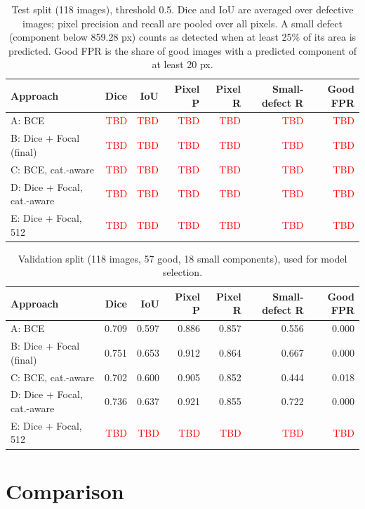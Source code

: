 \documentclass[11pt,a4paper]{article}
\newcommand{\tbd}{\textcolor{red}{TBD}}
\begin{document}
\begin{table}[H]
\centering
\small
\begin{tabular}{lrrrrrr}
\toprule
Approach & Dice & IoU & Pixel P & Pixel R & Small-defect R & Good FPR \\
\midrule
A: BCE & \tbd & \tbd & \tbd & \tbd & \tbd & \tbd \\
B: Dice + Focal (final) & \tbd & \tbd & \tbd & \tbd & \tbd & \tbd \\
C: BCE, cat.-aware & \tbd & \tbd & \tbd & \tbd & \tbd & \tbd \\
D: Dice + Focal, cat.-aware & \tbd & \tbd & \tbd & \tbd & \tbd & \tbd \\
E: Dice + Focal, 512 & \tbd & \tbd & \tbd & \tbd & \tbd & \tbd \\
\bottomrule
\end{tabular}
\caption{Test split (118 images), threshold 0.5. Dice and IoU are averaged over defective images; pixel precision and recall are pooled over all pixels. A small defect (component below 859.28 px) counts as detected when at least 25\% of its area is predicted. Good FPR is the share of good images with a predicted component of at least 20 px.}
\label{tab:test}
\end{table}

\begin{table}[H]
\centering
\small
\begin{tabular}{lrrrrrr}
\toprule
Approach & Dice & IoU & Pixel P & Pixel R & Small-defect R & Good FPR \\
\midrule
A: BCE & 0.709 & 0.597 & 0.886 & 0.857 & 0.556 & 0.000 \\
B: Dice + Focal (final) & 0.751 & 0.653 & 0.912 & 0.864 & 0.667 & 0.000 \\
C: BCE, cat.-aware & 0.702 & 0.600 & 0.905 & 0.852 & 0.444 & 0.018 \\
D: Dice + Focal, cat.-aware & 0.736 & 0.637 & 0.921 & 0.855 & 0.722 & 0.000 \\
E: Dice + Focal, 512 & \tbd & \tbd & \tbd & \tbd & \tbd & \tbd \\
\bottomrule
\end{tabular}
\caption{Validation split (118 images, 57 good, 18 small components), used for model selection.}
\label{tab:val}
\end{table}

\section{Comparison}
\end{document}
